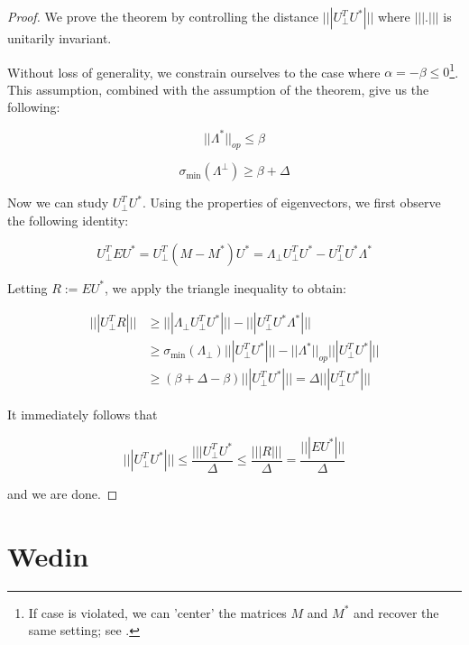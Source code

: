 \documentclass{amsart}
\begin{document}
\begin{proof}

  We prove the theorem by controlling the distance $|||U^{T}_{\perp}U^{*}|||$ where $|||.|||$ is unitarily invariant.

  Without loss of generality, we constrain ourselves to the case where $\alpha = -\beta \leq 0$\footnote{If case is violated, we can 'center' the matrices $M$ and $M^{*}$ and recover the same setting; see \cite{chen_spectral_2021}.}. This assumption, combined with the assumption of the theorem, give us the following:

  $$||\Lambda^{*}||_{op} \leq \beta$$

  $$\sigma_{\min}(\Lambda^{\perp}) \geq \beta + \Delta$$

  Now we can study $U^{T}_{\perp}U^{*}$. Using the properties of eigenvectors, we first observe the following identity:

  $$U^{T}_{\perp}EU^{*} = U^{T}_{\perp}(M - M^{*})U^{*} = \Lambda_{\perp}U^{T}_{\perp}U^{*} - U_{\perp}^{T}U^{*}\Lambda^{*}$$

  Letting $R := EU^{*}$, we apply the triangle inequality to obtain:

 \begin{align*}
   |||U^{T}_{\perp}R||| &\geq |||\Lambda_{\perp}U^{T}_{\perp}U^{*}||| - |||U_{\perp}^{T}U^{*}\Lambda^{*}||| \\
                        &\geq \sigma_{\min}(\Lambda_{\perp})|||U_{\perp}^{T}U^{*}||| - ||\Lambda^{*}||_{op}|||U_{\perp}^{T}U^{*}||| \\
  &\geq (\beta + \Delta - \beta) |||U^{T}_{\perp}U^{*}||| = \Delta |||U^{T}_{\perp}U^{*}|||
 \end{align*}

 It immediately follows that

 $$|||U^{T}_{\perp}U^{*}||| \leq \frac{|||U_{\perp}^{T}U^{*}}{\Delta} \leq \frac{|||R|||}{\Delta} = \frac{|||EU^{*}|||}{\Delta}$$

 and we are done.
\end{proof}


\section{Wedin}



\end{document}
